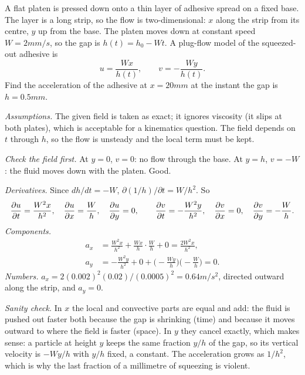 \begin{example}
A flat platen is pressed down onto a thin layer of adhesive spread on a fixed base. The layer is a long strip, so the flow is two-dimensional: $x$ along the strip from its centre, $y$ up from the base. The platen moves down at constant speed $W = 2\unit{mm/s}$, so the gap is $h(t) = h_0 - Wt$. A plug-flow model of the squeezed-out adhesive is
\[
u = \frac{Wx}{h(t)}, \qquad v = -\frac{Wy}{h(t)} .
\]
Find the acceleration of the adhesive at $x = 20\unit{mm}$ at the instant the gap is $h = 0.5\unit{mm}$.

\emph{Assumptions.} The given field is taken as exact; it ignores viscosity (it slips at both plates), which is acceptable for a kinematics question. The field depends on $t$ through $h$, so the flow is unsteady and the local term must be kept.

\emph{Check the field first.} At $y = 0$, $v = 0$: no flow through the base. At $y = h$, $v = -W$: the fluid moves down with the platen. Good.

\emph{Derivatives.} Since $dh/dt = -W$, $\partial(1/h)/\partial t = W/h^2$. So
\[
\frac{\partial u}{\partial t} = \frac{W^2 x}{h^2},\quad \frac{\partial u}{\partial x} = \frac{W}{h},\quad \frac{\partial u}{\partial y} = 0,\qquad
\frac{\partial v}{\partial t} = -\frac{W^2 y}{h^2},\quad \frac{\partial v}{\partial x} = 0,\quad \frac{\partial v}{\partial y} = -\frac{W}{h}.
\]
\emph{Components.}
\begin{align*}
a_x &= \frac{W^2x}{h^2} + \frac{Wx}{h}\cdot\frac{W}{h} + 0 = \frac{2W^2x}{h^2}, \\
a_y &= -\frac{W^2y}{h^2} + 0 + \Big(-\frac{Wy}{h}\Big)\Big(-\frac{W}{h}\Big) = 0 .
\end{align*}
\emph{Numbers.} $a_x = 2(0.002)^2(0.02)/(0.0005)^2 = 0.64\unit{m/s^2}$, directed outward along the strip, and $a_y = 0$.

\emph{Sanity check.} In $x$ the local and convective parts are equal and add: the fluid is pushed out faster both because the gap is shrinking (time) and because it moves outward to where the field is faster (space). In $y$ they cancel exactly, which makes sense: a particle at height $y$ keeps the same fraction $y/h$ of the gap, so its vertical velocity is $-W y/h$ with $y/h$ fixed, a constant. The acceleration grows as $1/h^2$, which is why the last fraction of a millimetre of squeezing is violent.
\end{example}

